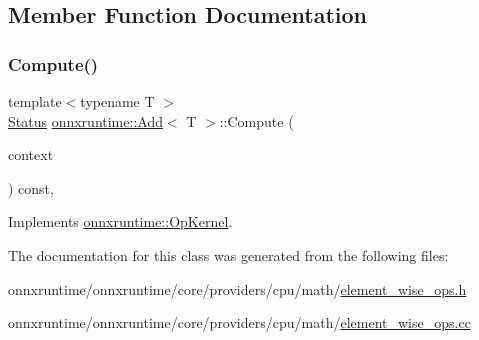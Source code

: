 \subsection{Member Function Documentation}
\mbox{\label{classonnxruntime_1_1Add_af637c6374902c81cf0e341029a750630}} 
\subsubsection{\texorpdfstring{Compute()}{Compute()}}
{\footnotesize\ttfamily template$<$typename T $>$ \\
\mbox{\hyperlink{classonnxruntime_1_1common_1_1Status}{Status}} \mbox{\hyperlink{classonnxruntime_1_1Add}{onnxruntime\+::\+Add}}$<$ T $>$\+::Compute (\begin{DoxyParamCaption}\item[{\mbox{\hyperlink{classonnxruntime_1_1OpKernelContext}{Op\+Kernel\+Context}} $\ast$}]{context }\end{DoxyParamCaption}) const\hspace{0.3cm}{\ttfamily [override]}, {\ttfamily [virtual]}}



Implements \mbox{\hyperlink{classonnxruntime_1_1OpKernel_a9eca8656a78b1b3ab9d3351a12798650}{onnxruntime\+::\+Op\+Kernel}}.



The documentation for this class was generated from the following files\+:\begin{DoxyCompactItemize}
\item 
onnxruntime/onnxruntime/core/providers/cpu/math/\mbox{\hyperlink{element__wise__ops_8h}{element\+\_\+wise\+\_\+ops.\+h}}\item 
onnxruntime/onnxruntime/core/providers/cpu/math/\mbox{\hyperlink{element__wise__ops_8cc}{element\+\_\+wise\+\_\+ops.\+cc}}\end{DoxyCompactItemize}
